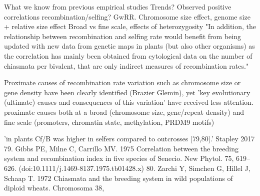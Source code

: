 \documentclass{article}
\begin{document}
What we know from previous empirical studies
Trends?
Observed positive correlations recombination/selfing?
GwRR. Chromosome size effect, genome size + relative size effect
Broad vs fine scale, effects of heterozygosity
"In addition, the relationship between recombination and selfing rate would benefit from being updated with new data from genetic maps in plants (but also other organisms) as the correlation has mainly been obtained from cytological data on the number of chiasmata per bivalent, that are only indirect measures of recombination rates."

Proximate causes of recombination rate variation such as chromosome size or gene density have been clearly identified (Brazier Glemin), yet 'key evolutionary (ultimate) causes and consequences of this variation' have received less attention.
proximate causes both at a broad (chromosome size, gene/repeat density) and fine scale (promoters, chromatin state, methylation, PRDM9 motifs)

'in plants Cf/B was higher in selfers compared to outcrosses [79,80].' Stapley 2017
79. Gibbs PE, Milne C, Carrillo MV. 1975 Correlation between the breeding system and recombination index in five species of Senecio. New Phytol. 75, 619–626. (doi:10.1111/j.1469-8137.1975.tb01428.x) 80. Zarchi Y, Simchen G, Hillel J, Schaap T. 1972 Chiasmata and the breeding system in wild populations of diploid wheats. Chromosoma 38,
\end{document}
